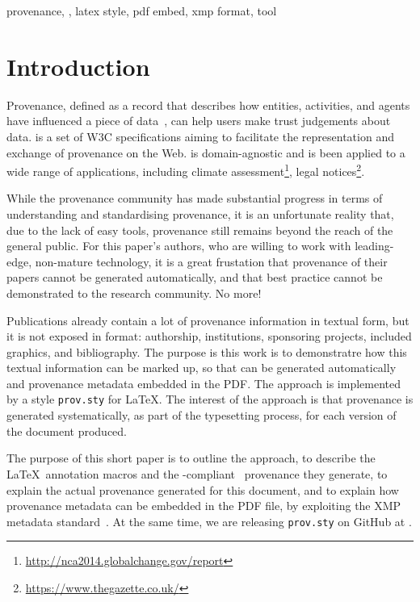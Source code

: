 \documentclass{sigplanconf}
\newcommand{\provsty}{{\tt prov.sty}\xspace}
\begin{document}


\keywords
provenance,
\PROV,
latex style,
pdf embed,
xmp format,
tool

\section{Introduction}

Provenance, defined as a record that describes how entities, activities, and
agents have influenced a piece of
data~\cite{Moreau:prov-dm:20130430}, can help users make trust
judgements about data. \PROV is a set of W3C
specifications aiming to
facilitate the representation and exchange of provenance on the
Web. \PROV is domain-agnostic and is been applied to a wide range of
applications, including climate
assessment\footnote{\url{http://nca2014.globalchange.gov/report}},
legal notices\footnote{\url{https://www.thegazette.co.uk/}}.

While the provenance community has made substantial progress in terms
of understanding and standardising provenance, it is an unfortunate
reality that, due to the lack of easy tools, provenance still remains
beyond the reach of the general public.  For this paper's authors,
who are willing to work with leading-edge, non-mature technology, it is
a great frustation that provenance of their papers cannot be generated
automatically, and that best practice cannot be demonstrated to the
research community.  No more!

Publications already contain a lot of provenance information in
textual form, but it is not exposed in \PROV format: authorship,
institutions, sponsoring projects, included graphics, and
bibliography. The purpose is this work is to demonstratre how this
textual information can be marked up, so that \PROV can be generated
automatically and provenance metadata embedded in the PDF.  The
approach is implemented by a style \provsty for \LaTeX.  The interest
of the approach is that provenance is generated systematically, as
part of the typesetting process, for each version of the document
produced.

The purpose of this short paper is to outline the approach, to
describe the \LaTeX\ annotation macros and the
\PROVO-compliant~\cite{Lebo:prov-o:20130430} provenance they generate,
to explain the actual provenance generated for this document, and to
explain how provenance metadata can be embedded in the PDF file, by
exploiting the XMP metadata standard~\cite{Adobe_XMP_Spec_part1}. At
the same time, we are releasing \provsty on GitHub at \provstyurl.
\end{document}
